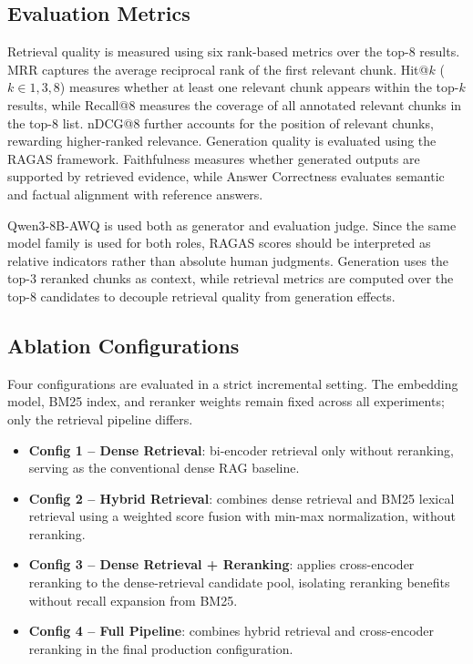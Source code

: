 \documentclass[runningheads]{llncs}
\begin{document}
\FloatBarrier

\subsection{Evaluation Metrics}

Retrieval quality is measured using six rank-based metrics over the top-8 results. MRR captures the average reciprocal rank of the first relevant chunk. Hit@$k$ ($k \in {1,3,8}$) measures whether at least one relevant chunk appears within the top-$k$ results, while Recall@8 measures the coverage of all annotated relevant chunks in the top-8 list. nDCG@8 further accounts for the position of relevant chunks, rewarding higher-ranked relevance. Generation quality is evaluated using the RAGAS framework. Faithfulness measures whether generated outputs are supported by retrieved evidence, while Answer Correctness evaluates semantic and factual alignment with reference answers.

Qwen3-8B-AWQ is used both as generator and evaluation judge. Since the same model family is used for both roles, RAGAS scores should be interpreted as relative indicators rather than absolute human judgments. Generation uses the top-3 reranked chunks as context, while retrieval metrics are computed over the top-8 candidates to decouple retrieval quality from generation effects.

\subsection{Ablation Configurations}

Four configurations are evaluated in a strict incremental setting. The embedding model, BM25 index, and reranker weights remain fixed across all experiments; only the retrieval pipeline differs.

\begin{itemize}

\item \textbf{Config 1 -- Dense Retrieval}: bi-encoder retrieval only without reranking, serving as the conventional dense RAG baseline.

\item \textbf{Config 2 -- Hybrid Retrieval}: combines dense retrieval and BM25 lexical retrieval using a weighted score fusion with min-max normalization, without reranking.

\item \textbf{Config 3 -- Dense Retrieval + Reranking}: applies cross-encoder reranking to the dense-retrieval candidate pool, isolating reranking benefits without recall expansion from BM25.

\item \textbf{Config 4 -- Full Pipeline}: combines hybrid retrieval and cross-encoder reranking in the final production configuration.

\end{itemize}
\end{document}
